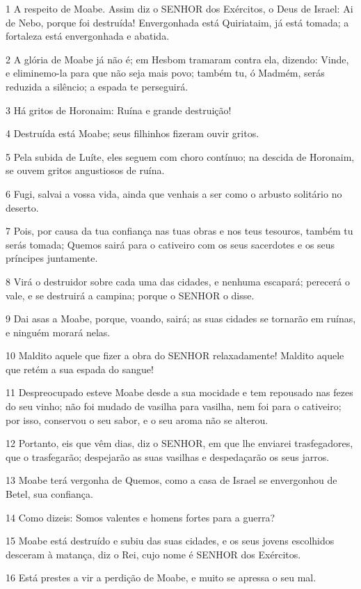 \par 1 A respeito de Moabe. Assim diz o SENHOR dos Exércitos, o Deus de Israel: Ai de Nebo, porque foi destruída! Envergonhada está Quiriataim, já está tomada; a fortaleza está envergonhada e abatida.
\par 2 A glória de Moabe já não é; em Hesbom tramaram contra ela, dizendo: Vinde, e eliminemo-la para que não seja mais povo; também tu, ó Madmém, serás reduzida a silêncio; a espada te perseguirá.
\par 3 Há gritos de Horonaim: Ruína e grande destruição!
\par 4 Destruída está Moabe; seus filhinhos fizeram ouvir gritos.
\par 5 Pela subida de Luíte, eles seguem com choro contínuo; na descida de Horonaim, se ouvem gritos angustiosos de ruína.
\par 6 Fugi, salvai a vossa vida, ainda que venhais a ser como o arbusto solitário no deserto.
\par 7 Pois, por causa da tua confiança nas tuas obras e nos teus tesouros, também tu serás tomada; Quemos sairá para o cativeiro com os seus sacerdotes e os seus príncipes juntamente.
\par 8 Virá o destruidor sobre cada uma das cidades, e nenhuma escapará; perecerá o vale, e se destruirá a campina; porque o SENHOR o disse.
\par 9 Dai asas a Moabe, porque, voando, sairá; as suas cidades se tornarão em ruínas, e ninguém morará nelas.
\par 10 Maldito aquele que fizer a obra do SENHOR relaxadamente! Maldito aquele que retém a sua espada do sangue!
\par 11 Despreocupado esteve Moabe desde a sua mocidade e tem repousado nas fezes do seu vinho; não foi mudado de vasilha para vasilha, nem foi para o cativeiro; por isso, conservou o seu sabor, e o seu aroma não se alterou.
\par 12 Portanto, eis que vêm dias, diz o SENHOR, em que lhe enviarei trasfegadores, que o trasfegarão; despejarão as suas vasilhas e despedaçarão os seus jarros.
\par 13 Moabe terá vergonha de Quemos, como a casa de Israel se envergonhou de Betel, sua confiança.
\par 14 Como dizeis: Somos valentes e homens fortes para a guerra?
\par 15 Moabe está destruído e subiu das suas cidades, e os seus jovens escolhidos desceram à matança, diz o Rei, cujo nome é SENHOR dos Exércitos.
\par 16 Está prestes a vir a perdição de Moabe, e muito se apressa o seu mal.
